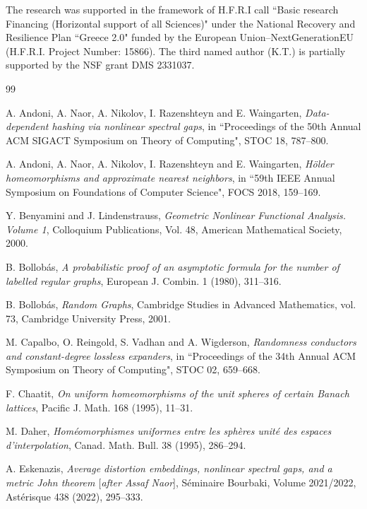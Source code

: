 \documentclass[11pt,leqno]{amsart}
\theoremstyle{remark}
\theoremstyle{plain}
\begin{document}
The research was supported in the framework of H.F.R.I call ``Basic research Financing
(Horizontal support of all Sciences)" under the National Recovery and Resilience Plan ``Greece 2.0"
funded by the European Union--NextGenerationEU (H.F.R.I. Project Number: 15866).
The third named author (K.T.) is partially supported by the NSF grant DMS 2331037.

\begin{thebibliography}{99}

 A. Andoni, A. Naor, A. Nikolov, I. Razenshteyn and E. Waingarten,
\emph{Data-dependent hashing via nonlinear spectral gaps}, in ``Proceedings of the 50th Annual
ACM SIGACT Symposium on Theory of Computing"\!, STOC 18, 787--800.

 A. Andoni, A. Naor, A. Nikolov, I. Razenshteyn and E. Waingarten,
\emph{H\"{o}lder homeomorphisms and approximate nearest neighbors}, in ``59th IEEE Annual Symposium on
Foundations of Computer Science"\!, FOCS 2018, 159--169.

 Y. Benyamini and J. Lindenstrauss,
\emph{Geometric Nonlinear Functional Analysis. Volume 1},
Colloquium Publications, Vol. 48, American Mathematical Society, 2000.

 B. Bollob\'{a}s,
\emph{A probabilistic proof of an asymptotic formula for the number of labelled regular graphs},
European J. Combin. 1 (1980), 311--316.

 B. Bollob\'{a}s,
\emph{Random Graphs},
Cambridge Studies in Advanced Mathematics, vol. 73, Cambridge University Press, 2001.

 M. Capalbo, O. Reingold, S. Vadhan and A. Wigderson,
\emph{Randomness conductors and constant-degree lossless expanders},
in ``Proceedings of the 34th Annual ACM Symposium on Theory of Computing"\!, STOC 02, 659--668.

 F. Chaatit,
\emph{On uniform homeomorphisms of the unit spheres of certain Banach lattices},
Pacific J. Math. 168 (1995), 11--31.

 M. Daher,
\emph{Hom\'{e}omorphismes uniformes entre les sph\`{e}res unit\'{e} des espaces d’interpolation},
Canad. Math. Bull. 38 (1995), 286--294.

 A. Eskenazis,
\emph{Average distortion embeddings, nonlinear spectral gaps, and a metric John theorem $[$after Assaf Naor$]$},
S\'{e}minaire Bourbaki, Volume 2021/2022, Ast\'{e}risque 438 (2022), 295--333.


\end{thebibliography}
\end{document}
